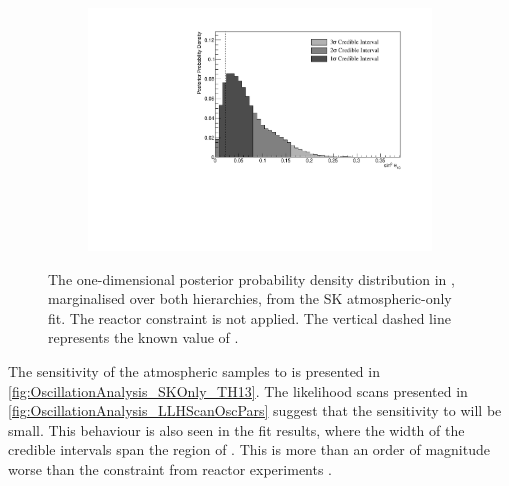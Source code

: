 \begin{figure}[h]
  \begin{subfigure}[t]{0.98\textwidth}
    \includegraphics[width=\textwidth, trim={0mm 0mm 0mm 0mm}, clip,page=1]{Figures/OA/SKOnlyFit/Contours_1D_th13_BH_1_woRC_UnSmeared_CredibleInterval.pdf}
  \end{subfigure}
  \caption{The one-dimensional posterior probability density distribution in , marginalised over both hierarchies, from the SK atmospheric-only fit. The reactor constraint is not applied. The vertical dashed line represents the known value of .}
  \label{fig:OscillationAnalysis_SKOnly_TH13}
\end{figure}

The sensitivity of the atmospheric samples to  is presented in \autoref{fig:OscillationAnalysis_SKOnly_TH13}. The likelihood scans presented in \autoref{fig:OscillationAnalysis_LLHScanOscPars} suggest that the sensitivity to  will be small. This behaviour is also seen in the fit results, where the width of the \quickmath{1\sigma} credible intervals span the region of . This is more than an order of magnitude worse than the constraint from reactor experiments \cite{Particle_Data_Group2020-ms}.

